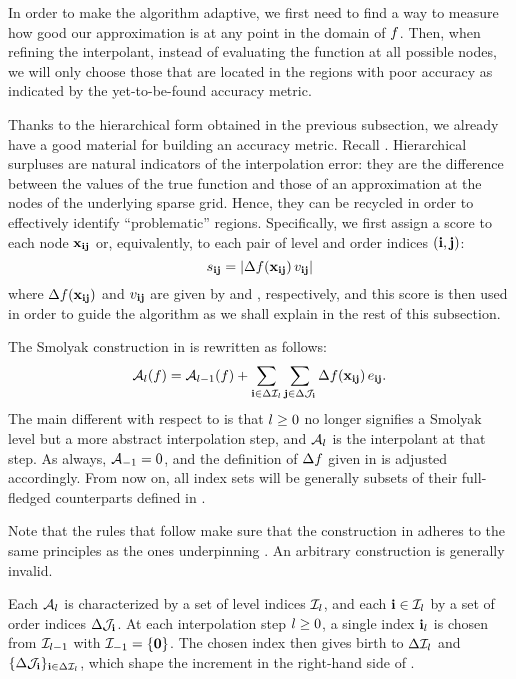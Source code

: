 In order to make the algorithm adaptive, we first need to find a way to measure
how good our approximation is at any point in the domain of $f$. Then, when
refining the interpolant, instead of evaluating the function at all possible
nodes, we will only choose those that are located in the regions with poor
accuracy as indicated by the yet-to-be-found accuracy metric.

Thanks to the hierarchical form obtained in the previous subsection, we already
have a good material for building an accuracy metric. Recall .
Hierarchical surpluses are natural indicators of the interpolation error: they
are the difference between the values of the true function and those of an
approximation at the nodes of the underlying sparse grid. Hence, they can be
recycled in order to effectively identify ``problematic'' regions. Specifically,
we first assign a score to each node $\mathbf{x}_{\mathbf{i}\mathbf{j}}$ or, equivalently, to each
pair of level and order indices $(\mathbf{i}, \mathbf{j})$:
\begin{equation} \elab{score}
  \score_{\vi\vj} = \left| \surplus(\vx_{\vi\vj}) \, \w_{\vi\vj} \right|
\end{equation}
where $\Delta f(\mathbf{x}_{\mathbf{i}\mathbf{j}})$ and $v_{\mathbf{i}\mathbf{j}}$ are given by  and
, respectively, and this score is then used in order to guide the
algorithm as we shall explain in the rest of this subsection.

The Smolyak construction in  is rewritten as follows:
\begin{equation} \elab{approximation}
  \approximation{\l}(\f) = \approximation{\l-1}(\f) + \sum_{\vi \in \Delta\lindex_\l} \sum_{\vj \in \Delta\oindex_\vi} \surplus(\vx_{\vi\vj}) \,
\e_{\vi\vj}.
\end{equation}
The main different with respect to  is that $l \geq
0$ no longer signifies a Smolyak level but a more abstract interpolation step,
and $\mathcal{A}_{l}$ is the interpolant at that step. As always,
$\mathcal{A}_{-1} = 0$, and the definition of $\Delta f$ given in
 is adjusted accordingly. From now on, all index sets will be
generally subsets of their full-fledged counterparts defined in .

Note that the rules that follow make sure that the construction in
 adheres to the same principles as the ones underpinning
. An arbitrary construction is generally invalid.

Each $\mathcal{A}_{l}$ is characterized by a set of level indices
$\mathcal{I}_l$, and each $\mathbf{i} \in \mathcal{I}_l$ by a set of order indices
$\Delta\mathcal{J}_{\mathbf{i}}$. At each interpolation step $l \geq 0$, a single index
$\mathbf{i}_l$ is chosen from $\mathcal{I}_{l-1}$ with $\mathcal{I}_{-1} = \{ \mathbf{0} \}$. The
chosen index then gives birth to $\Delta\mathcal{I}_l$ and $\{ \Delta\mathcal{J}_{\mathbf{i}}
\}_{\mathbf{i} \in \Delta\mathcal{I}_l}$, which shape the increment in the right-hand side
of .

